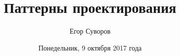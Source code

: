 \documentclass[utf8,xcolor=table]{beamer}
\title{Паттерны проектирования}
\author{Егор Суворов}
\institute[СПб АУ]{Курс <<Парадигмы и языки программирования>>, подгруппа 3}
\date[09.10.2016]{Понедельник, 9 октября 2017 года}
\begin{document}
\begin{frame}
\titlepage
\end{frame}




\end{document}
